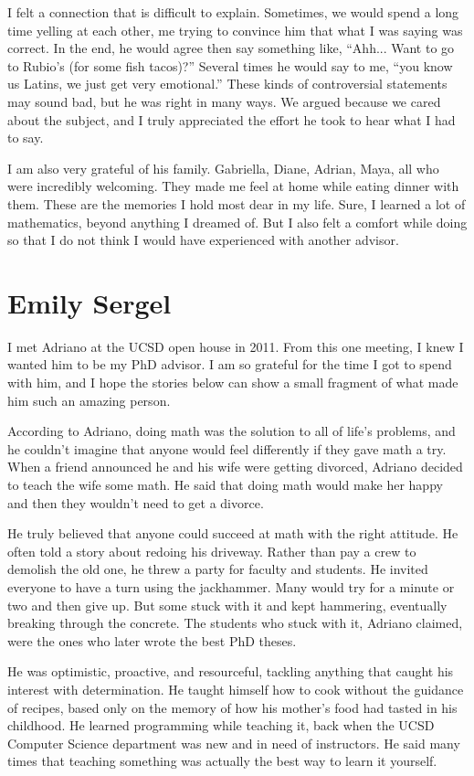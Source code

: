 \documentclass{amsart}
\begin{document}
I felt a connection that is difficult to explain. Sometimes, we would spend a long time yelling at each other, me trying to convince him that what I was saying was correct. In the end, he would agree then say something like, ``Ahh... Want to go to Rubio's (for some fish tacos)?'' Several times he would say to me, ``you know us Latins, we just get very emotional.'' These kinds of controversial statements may sound bad, but he was right in many ways. We argued because we cared about the subject, and I truly appreciated the effort he took to hear what I had to say. 

I am also very grateful of his family. Gabriella, Diane, Adrian, Maya, all who were incredibly welcoming. They made me feel at home while eating dinner with them. These are the memories I hold most dear in my life. Sure, I learned a lot of mathematics, beyond anything I dreamed of. But I also felt a comfort while doing so that I do not think I would have experienced with another advisor.

\section*{Emily Sergel}
I met Adriano at the UCSD open house in 2011. From this one meeting, I knew I wanted him to be my PhD advisor. I am so grateful for the time I got to spend with him, and I hope the stories below can show a small fragment of what made him such an amazing person.

According to Adriano, doing math was the solution to all of life's problems, and he couldn't imagine that anyone would feel differently if they gave math a try. When a friend announced he and his wife were getting divorced, Adriano decided to teach the wife some math. He said that doing math would make her happy and then they wouldn't need to get a divorce.

He truly believed that anyone could succeed at math with the right attitude. He often told a story about redoing his driveway. Rather than pay a crew to demolish the old one, he threw a party for faculty and students. He invited everyone to have a turn using the jackhammer. Many would try for a minute or two and then give up. But some stuck with it and kept hammering, eventually breaking through the concrete. The students who stuck with it, Adriano claimed, were the ones who later wrote the best PhD theses.

He was optimistic, proactive, and resourceful, tackling anything that caught his interest with determination. He taught himself how to cook without the guidance of recipes, based only on the memory of how his mother’s food had tasted in his childhood. He learned programming while teaching it, back when the UCSD Computer Science department was new and in need of instructors. He said many times that teaching something was actually the best way to learn it yourself.
\end{document}
